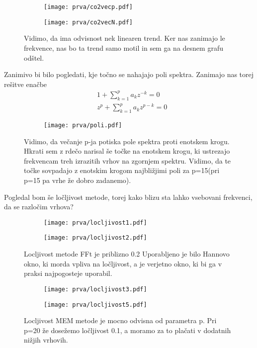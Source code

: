 \documentclass{article}
\begin{document}
\begin{figure}[H]
\centering
\begin{subfigure}{.49\textwidth}
\texttt{[image: prva/co2vecp.pdf]}
\end{subfigure}
\begin{subfigure}{.49\textwidth}
\texttt{[image: prva/co2vecN.pdf]}
\end{subfigure}
\caption*{Vidimo, da ima odvisnost nek linearen trend. Ker nas zanimajo le frekvence, nas bo ta trend samo motil in sem ga na desnem grafu odštel.}
\end{figure}

Zanimivo bi bilo pogledati, kje točno se nahajajo poli spektra. Zanimajo nas torej rešitve enačbe
\begin{align*}
&1 + \sum_{k=1}^p a_k z^{-k} = 0 \\
&z^p + \sum_{k=1}^p a_k z^{p-k} = 0
\end{align*}

\begin{figure}[H]
\centering
\begin{subfigure}{.7\textwidth}
\texttt{[image: prva/poli.pdf]}
\end{subfigure}
\caption*{Vidimo, da večanje p-ja potiska pole spektra proti enotskem krogu. Hkrati sem z rdečo narisal še točke na enotskem krogu, ki ustrezajo frekvencam treh izrazitih vrhov na zgornjem spektru. Vidimo, da te točke sovpadajo z enotskim krogom najbližjimi poli za p=15(pri p=15 pa vrhe že dobro zadanemo).}
\end{figure}


Pogledal bom še ločljivost metode, torej kako blizu sta lahko vsebovani frekvenci, da se razločim vrhova?

\begin{figure}[H]
\centering
\begin{subfigure}{.49\textwidth}
\texttt{[image: prva/locljivost1.pdf]}
\end{subfigure}
\begin{subfigure}{.49\textwidth}
\texttt{[image: prva/locljivost2.pdf]}
\end{subfigure}
\caption*{Locljivost metode FFt je priblizno 0.2 Uporabljeno je bilo Hannovo okno, ki morda vpliva na ločljivost, a je verjetno okno, ki bi ga v praksi najpogosteje uporabil.}
\end{figure}


\begin{figure}[H]
\centering
\begin{subfigure}{.49\textwidth}
\texttt{[image: prva/locljivost3.pdf]}
\end{subfigure}
\begin{subfigure}{.49\textwidth}
\texttt{[image: prva/locljivost5.pdf]}
\end{subfigure}
\caption*{Locljivost MEM metode je mocno odvisna od parametra p. Pri p=20 že dosežemo ločljivost 0.1, a moramo za to plačati v dodatnih nižjih vrhovih.}
\end{figure}
\end{document}
